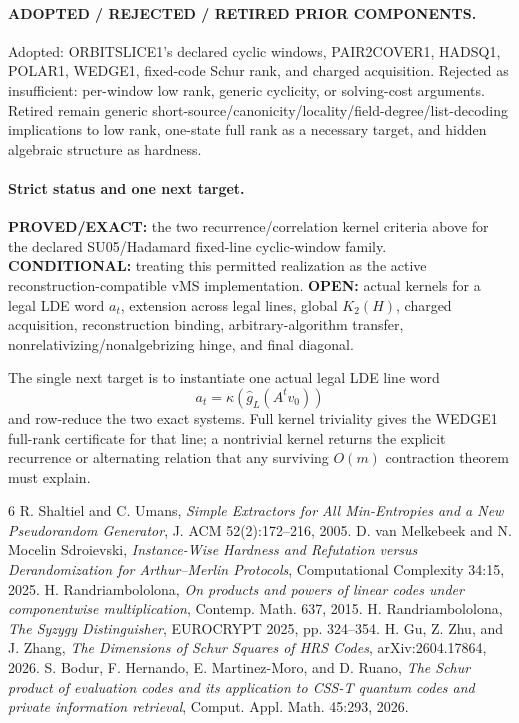 \documentclass[11pt]{article}
\begin{document}
\paragraph{ADOPTED / REJECTED / RETIRED PRIOR COMPONENTS.}
Adopted: ORBITSLICE1's declared cyclic windows, PAIR2COVER1, HADSQ1, POLAR1, WEDGE1, fixed-code Schur rank, and charged acquisition. Rejected as insufficient: per-window low rank, generic cyclicity, or solving-cost arguments. Retired remain generic short-source/canonicity/locality/field-degree/list-decoding implications to low rank, one-state full rank as a necessary target, and hidden algebraic structure as hardness.

\paragraph{Strict status and one next target.}
\textbf{PROVED/EXACT:} the two recurrence/correlation kernel criteria above for the declared SU05/Hadamard fixed-line cyclic-window family.
\textbf{CONDITIONAL:} treating this permitted realization as the active reconstruction-compatible vMS implementation.
\textbf{OPEN:} actual kernels for a legal LDE word \(a_t\), extension across legal lines, global \(K_2(H)\), charged acquisition, reconstruction binding, arbitrary-algorithm transfer, nonrelativizing/nonalgebrizing hinge, and final diagonal.

The single next target is to instantiate one actual legal LDE line word
\[
a_t=\kappa(\widehat g_L(A^tv_0))
\]
and row-reduce the two exact systems. Full kernel triviality gives the WEDGE1 full-rank certificate for that line; a nontrivial kernel returns the explicit recurrence or alternating relation that any surviving \(O(m)\) contraction theorem must explain.

\begin{thebibliography}{6}
 R. Shaltiel and C. Umans, \emph{Simple Extractors for All Min-Entropies and a New Pseudorandom Generator}, J. ACM 52(2):172--216, 2005.
 D. van Melkebeek and N. Mocelin Sdroievski, \emph{Instance-Wise Hardness and Refutation versus Derandomization for Arthur--Merlin Protocols}, Computational Complexity 34:15, 2025.
 H. Randriambololona, \emph{On products and powers of linear codes under componentwise multiplication}, Contemp. Math. 637, 2015.
 H. Randriambololona, \emph{The Syzygy Distinguisher}, EUROCRYPT 2025, pp. 324--354.
 H. Gu, Z. Zhu, and J. Zhang, \emph{The Dimensions of Schur Squares of HRS Codes}, arXiv:2604.17864, 2026.
 S. Bodur, F. Hernando, E. Martinez-Moro, and D. Ruano, \emph{The Schur product of evaluation codes and its application to CSS-T quantum codes and private information retrieval}, Comput. Appl. Math. 45:293, 2026.
\end{thebibliography}
\end{document}
